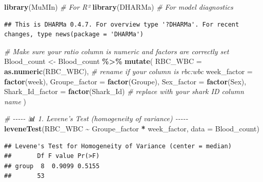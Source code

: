\documentclass[
]{article}
\newenvironment{Shaded}{\begin{snugshade}}{\end{snugshade}}
\newcommand{\AttributeTok}[1]{\textcolor[rgb]{0.13,0.29,0.53}{#1}}
\newcommand{\CommentTok}[1]{\textcolor[rgb]{0.56,0.35,0.01}{\textit{#1}}}
\newcommand{\FunctionTok}[1]{\textcolor[rgb]{0.13,0.29,0.53}{\textbf{#1}}}
\newcommand{\NormalTok}[1]{#1}
\newcommand{\OtherTok}[1]{\textcolor[rgb]{0.56,0.35,0.01}{#1}}
\newcommand{\SpecialCharTok}[1]{\textcolor[rgb]{0.81,0.36,0.00}{\textbf{#1}}}
\begin{document}
\begin{Shaded}
\begin{Highlighting}[]
\FunctionTok{library}\NormalTok{(MuMIn)      }\CommentTok{\# For R²}
\FunctionTok{library}\NormalTok{(DHARMa)     }\CommentTok{\# For model diagnostics}
\end{Highlighting}
\end{Shaded}

\begin{verbatim}
## This is DHARMa 0.4.7. For overview type '?DHARMa'. For recent changes, type news(package = 'DHARMa')
\end{verbatim}

\begin{Shaded}
\begin{Highlighting}[]
\CommentTok{\# Make sure your ratio column is numeric and factors are correctly set}
\NormalTok{Blood\_count }\OtherTok{\textless{}{-}}\NormalTok{ Blood\_count }\SpecialCharTok{\%\textgreater{}\%}
  \FunctionTok{mutate}\NormalTok{(}
    \AttributeTok{RBC\_WBC =} \FunctionTok{as.numeric}\NormalTok{(RBC\_WBC),     }\CommentTok{\# rename if your column is \textasciigrave{}rbc:wbc\textasciigrave{}}
    \AttributeTok{week\_factor =} \FunctionTok{factor}\NormalTok{(week),}
    \AttributeTok{Groupe\_factor =} \FunctionTok{factor}\NormalTok{(Groupe),}
    \AttributeTok{Sex\_factor =} \FunctionTok{factor}\NormalTok{(Sex),}
    \AttributeTok{Shark\_Id\_factor =} \FunctionTok{factor}\NormalTok{(Shark\_Id) }\CommentTok{\# replace with your shark ID column name}
\NormalTok{  )}

\CommentTok{\# {-}{-}{-}{-}{-} 📊 1. Levene’s Test (homogeneity of variance) {-}{-}{-}{-}{-}}
\FunctionTok{leveneTest}\NormalTok{(RBC\_WBC }\SpecialCharTok{\textasciitilde{}}\NormalTok{ Groupe\_factor }\SpecialCharTok{*}\NormalTok{ week\_factor, }\AttributeTok{data =}\NormalTok{ Blood\_count)}
\end{Highlighting}
\end{Shaded}

\begin{verbatim}
## Levene's Test for Homogeneity of Variance (center = median)
##       Df F value Pr(>F)
## group  8  0.9099 0.5155
##       53
\end{verbatim}

\begin{Shaded}
\end{Shaded}
\end{document}
